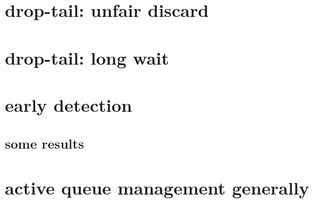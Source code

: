 \section{drop-tail: unfair discard}


\section{drop-tail: long wait}


\section{early detection}


\subsection{some results}


\section{active queue management generally}

